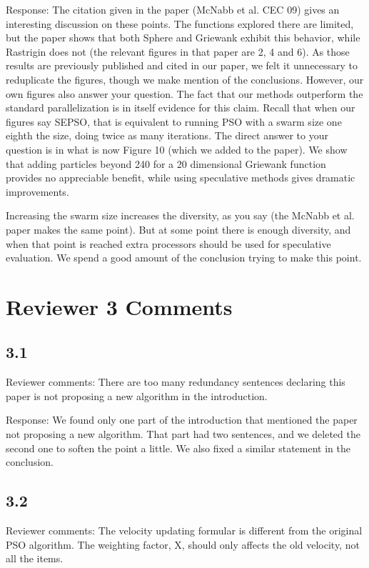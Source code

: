 \documentclass[onecolumn, 12pt]{article}
\begin{document}
Response: The citation given in the paper (McNabb et al. CEC 09) gives an
interesting discussion on these points.  The functions explored there are
limited, but the paper shows that both Sphere and Griewank exhibit this
behavior, while Rastrigin does not (the relevant figures in that paper are 2, 4
and 6).  As those results are previously published and cited in our paper, we
felt it unnecessary to reduplicate the figures, though we make mention of the
conclusions.  However, our own figures also answer your question.  The fact
that our methods outperform the standard parallelization is in itself evidence
for this claim.  Recall that when our figures say SEPSO, that is equivalent to
running PSO with a swarm size one eighth the size, doing twice as many
iterations.  The direct answer to your question is in what is now Figure 10
(which we added to the paper).  We show that adding particles beyond 240 for a
20 dimensional Griewank function provides no appreciable benefit, while using
speculative methods gives dramatic improvements.

Increasing the swarm size increases the diversity, as you say (the McNabb et
al. paper makes the same point).  But at some point there is enough diversity,
and when that point is reached extra processors should be used for speculative
evaluation.  We spend a good amount of the conclusion trying to make this
point.

\section*{Reviewer 3 Comments}

\subsection*{3.1}

Reviewer comments: There are too many redundancy sentences declaring this paper
is not proposing a new algorithm in the introduction.

Response: We found only one part of the introduction that mentioned the paper
not proposing a new algorithm.  That part had two sentences, and we deleted the
second one to soften the point a little.  We also fixed a similar statement in
the conclusion.

\subsection*{3.2}

Reviewer comments: The velocity updating formular is different from the
original PSO algorithm.  The weighting factor, X, should only affects the old
velocity, not all the items.
\end{document}
